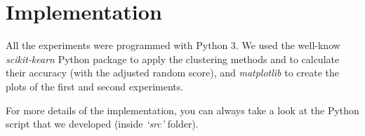 \section{Implementation}
\label{sec:implementation}

All the experiments were programmed with Python 3. We used the well-know \textit{scikit-kearn} \cite{scikit-learn} Python package to apply the clustering methods and to calculate their accuracy (with the adjusted random score), and \textit{matplotlib} \cite{matplotlib} to create the plots of the first and second experiments. 

For more details of the implementation, you can always take a look at the Python script that we developed (inside \textit{`src'} folder).